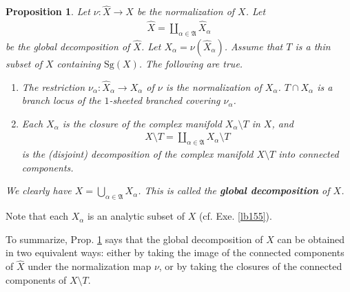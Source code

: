 \documentclass[12pt,b5paper,notitlepage]{report}
\theoremstyle{definition}
\theoremstyle{plain}
\newtheorem{pp}[df]{Proposition}
\newcommand{\fk}{\mathfrak}
\newcommand{\wht}{\widehat}
\newcommand{\Sg}{\mathrm{Sg}}
\numberwithin{equation}{section}
\begin{document}
\begin{pp}\label{lb238}
Let $\nu:\wht X\rightarrow X$ be the normalization of $X$. Let
\begin{align*}
\wht X=\coprod_{\alpha\in\fk A}\wht X_\alpha
\end{align*}
be the global decomposition of $\wht X$. Let $X_\alpha=\nu(\wht X_\alpha)$. Assume that  $T$ is a thin subset of $X$ {\color{red}containing $\Sg(X)$}.  The following are true.
\begin{enumerate}
\item The restriction $\nu_\alpha:\wht X_\alpha\rightarrow X_\alpha$ of $\nu$ is the normalization of $X_\alpha$. $T\cap X_\alpha$ is a branch locus of the $1$-sheeted branched covering $\nu_\alpha$. 

\item Each $X_\alpha$ is the closure of the complex manifold $X_\alpha\setminus T$ in $X$, and
\begin{align*}
X\setminus T=\coprod_{\alpha\in\fk A}X_\alpha\setminus T
\end{align*}
is the (disjoint) decomposition of the complex manifold $X\setminus T$ into connected components.
\end{enumerate}
We clearly have $X=\bigcup_{\alpha\in\fk A}X_\alpha$. This is called the \textbf{global decomposition}  of $X$.
\end{pp}

Note that each $X_\alpha$ is an analytic subset of $X$ (cf. Exe. \ref{lb155}). 

To summarize, Prop. \ref{lb238} says that the global decomposition of $X$ can be obtained in two equivalent ways: either by taking the image of the connected components of $\wht X$ under the normalization map $\nu$, or by taking the closures of the connected components of $X\setminus T$.
\end{document}
